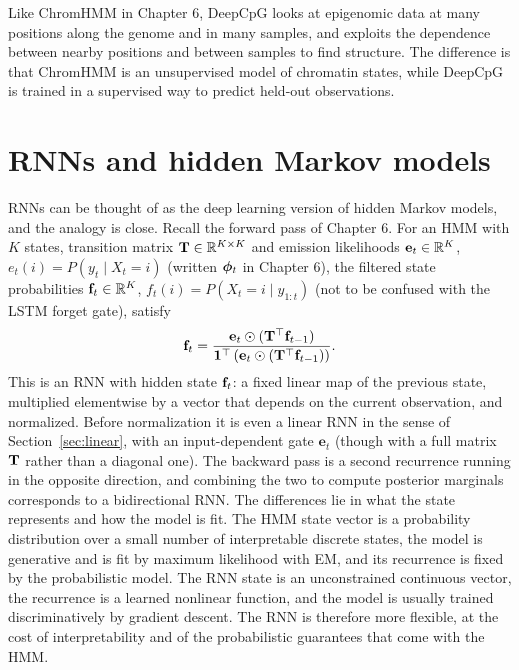 Like ChromHMM in Chapter 6, DeepCpG looks at epigenomic data at many positions along the genome and in many samples, and exploits the dependence between nearby positions and between samples to find structure. The difference is that ChromHMM is an unsupervised model of chromatin states, while DeepCpG is trained in a supervised way to predict held-out observations.

\section{RNNs and hidden Markov models}
\label{sec:rnn_hmm}

RNNs can be thought of as the deep learning version of hidden Markov models, and the analogy is close. Recall the forward pass of Chapter 6. For an HMM with $K$ states, transition matrix $\mathbf{T}\in\mathbb{R}^{K\times K}$ and emission likelihoods $\mathbf{e}_t\in\mathbb{R}^K$, $e_t(i)=P(y_t\mid X_t=i)$ (written $\boldsymbol{\phi}_t$ in Chapter 6), the filtered state probabilities $\mathbf{f}_t\in\mathbb{R}^K$, $f_t(i)=P(X_t=i\mid y_{1:t})$ (not to be confused with the LSTM forget gate), satisfy
\begin{equation}
  \mathbf{f}_t = \frac{\mathbf{e}_t\odot(\mathbf{T}^\top\mathbf{f}_{t-1})}{\mathbf{1}^\top\left(\mathbf{e}_t\odot(\mathbf{T}^\top\mathbf{f}_{t-1})\right)} .
\end{equation}
This is an RNN with hidden state $\mathbf{f}_t$: a fixed linear map of the previous state, multiplied elementwise by a vector that depends on the current observation, and normalized. Before normalization it is even a linear RNN in the sense of Section~\ref{sec:linear}, with an input-dependent gate $\mathbf{e}_t$ (though with a full matrix $\mathbf{T}$ rather than a diagonal one). The backward pass is a second recurrence running in the opposite direction, and combining the two to compute posterior marginals corresponds to a bidirectional RNN. The differences lie in what the state represents and how the model is fit. The HMM state vector is a probability distribution over a small number of interpretable discrete states, the model is generative and is fit by maximum likelihood with EM, and its recurrence is fixed by the probabilistic model. The RNN state is an unconstrained continuous vector, the recurrence is a learned nonlinear function, and the model is usually trained discriminatively by gradient descent. The RNN is therefore more flexible, at the cost of interpretability and of the probabilistic guarantees that come with the HMM.

